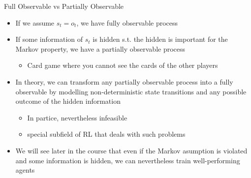 \begin{frame}[c]{Full Observable vs Partially Observable}
	
	\begin{itemize}
		\item If we assume $s_t = o_t$, we have fully observable process
		\pause
		\item If some information of $s_t$ is hidden s.t. the hidden is important for the Markov property, we have a partially observable process
		\begin{itemize}
			\item Card game where you cannot see the cards of the other players
		\end{itemize}
		\pause
		\medskip
		\item In theory, we can transform any partially observable process into a fully observable by modelling non-deterministic state transitions and any possible outcome of the hidden information
		\begin{itemize}
			\item In partice, nevertheless infeasible
			\item special subfield of RL that deals with such problems
		\end{itemize}
		\pause
		\medskip
		\item We will see later in the course that even if the Markov asumption is violated and some information is hidden, we can nevertheless train well-performing agents
	\end{itemize}

\end{frame}

